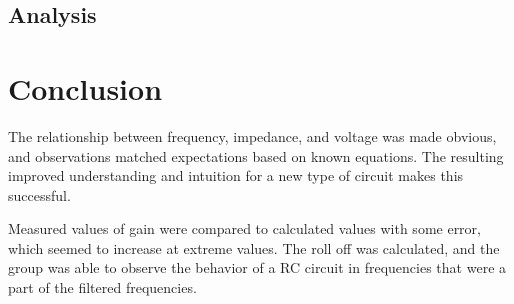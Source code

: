 \documentclass[twocolumn, amsmath]{revtex4}
\begin{document}
 
\subsection{Analysis}


\section{Conclusion}
The relationship between frequency, impedance, and voltage was made obvious, and observations matched expectations based on known equations. The resulting improved understanding and intuition for a new type of circuit makes this successful.

Measured values of gain were compared to calculated values with some error, which seemed to increase at extreme values. The roll off was calculated, and the group was able to observe the behavior of a RC circuit in frequencies that were a part of the filtered frequencies.
\end{document}
